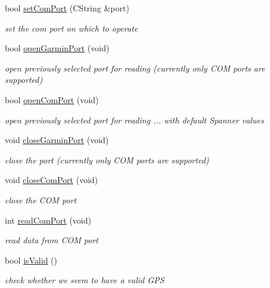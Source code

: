 \begin{DoxyCompactItemize}
bool \hyperlink{classCRPGarmCom_ad40670c8653858333fbe11991079994c}{setComPort} (CString \&port)
\begin{DoxyCompactList}\small\item\em set the com port on which to operate \item\end{DoxyCompactList}\item 
bool \hyperlink{classCRPGarmCom_a33880a28543f9a14fc04111829688768}{openGarminPort} (void)
\begin{DoxyCompactList}\small\item\em open previously selected port for reading (currently only COM ports are supported) \item\end{DoxyCompactList}\item 
bool \hyperlink{classCRPGarmCom_ae14a9d049104c720253c07f6701d5173}{openComPort} (void)
\begin{DoxyCompactList}\small\item\em open previously selected port for reading ... with default Spanner values \item\end{DoxyCompactList}\item 
void \hyperlink{classCRPGarmCom_ae246ed4a7806d140aeef2bc3477b6cd1}{closeGarminPort} (void)
\begin{DoxyCompactList}\small\item\em close the port (currently only COM ports are supported) \item\end{DoxyCompactList}\item 
void \hyperlink{classCRPGarmCom_a09213c5020f0d47f7ec1e9c3221db7f7}{closeComPort} (void)
\begin{DoxyCompactList}\small\item\em close the COM port \item\end{DoxyCompactList}\item 
int \hyperlink{classCRPGarmCom_a76d4078f237ba98e567b34447e7ae445}{readComPort} (void)
\begin{DoxyCompactList}\small\item\em read data from COM port \item\end{DoxyCompactList}\item 
bool \hyperlink{classCRPGarmCom_a4717f6f353ade216d6dd51acbfeb7c87}{isValid} ()
\begin{DoxyCompactList}\small\item\em check whether we seem to have a valid GPS \item\end{DoxyCompactList}\item 

\end{DoxyCompactItemize}
